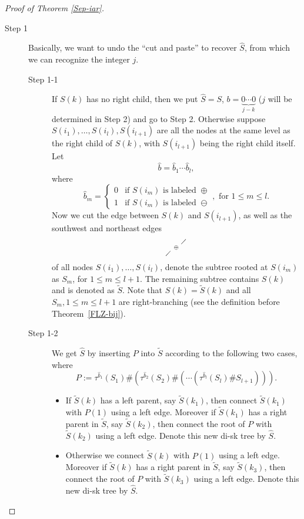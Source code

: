 \documentclass[11pt,reqno]{amsart}
\numberwithin{equation}{section}
\theoremstyle{plain}
\theoremstyle{definition}
\begin{document}
\begin{proof}[Proof of Theorem \ref{Sep-iar}]
\begin{description}
	\item[Step 1] Basically, we want to undo the ``cut and paste'' to recover $\hat{S}$, from which we can recognize the integer $j$. 
    \begin{description}
    	\item[Step 1-1] If $S(k)$ has no right child, then we put $\hat{S}=S$, $b=\underbrace{0\cdots 0}_{j-k}$ ($j$ will be determined in Step 2) and go to Step 2. Otherwise suppose $S(i_1),\ldots,S(i_l),S(i_{l+1})$ are all the nodes at the same level as the right child of $S(k)$, with $S(i_{l+1})$ being the right child itself. Let $$\hat{b}=\hat{b}_1\cdots\hat{b}_l,$$ where $$\hat{b}_m=\begin{cases}0 & \text{if $S(i_{m})$ is labeled $\oplus$}\\ 1 & \text{if $S(i_{m})$ is labeled $\ominus$}\end{cases}, \text{ for $1\le m\le l$}.$$ Now we cut the edge between $S(k)$ and $S(i_{l+1})$, as well as the southwest and northeast edges $$
    \begin{smallmatrix}
    & & \diagup \\
	& \oplus & \\
	\diagup & & \\
	\end{smallmatrix}$$ of all nodes $S(i_1),\ldots,S(i_{l})$, denote the subtree rooted at $S(i_m)$ as $S_m$, for $1\le m\le l+1$. The remaining subtree contains $S(k)$ and is denoted as $\tilde{S}$. Note that $S(k)=\tilde{S}(k)$ and all $S_m, 1\le m\le l+1$ are right-branching (see the definition before Theorem~\ref{FLZ-bij}). 
    	\item[Step 1-2] We get $\hat{S}$ by inserting $P$ into $\tilde{S}$ according to the following two cases, where
        $$P:=\tau^{\hat{b}_1}(S_1)\#(\tau^{\hat{b}_2}(S_2)\#(\cdots(\tau^{\hat{b}_l}(S_l)\#S_{l+1}))).$$
        \begin{itemize}
        	\item If $\tilde{S}(k)$ has a left parent, say $\tilde{S}(k_1)$, then connect $\tilde{S}(k_1)$ with $P(1)$ using a left edge. Moreover if $\tilde{S}(k_1)$ has a right parent in $\tilde{S}$, say $\tilde{S}(k_2)$, then connect the root of $P$ with $\tilde{S}(k_2)$ using a left edge. Denote this new di-sk tree by $\hat{S}$.
        	\item Otherwise we connect $\tilde{S}(k)$ with $P(1)$ using a left edge. Moreover if $\tilde{S}(k)$ has a right parent in $\tilde{S}$, say $\tilde{S}(k_3)$, then connect the root of $P$ with $\tilde{S}(k_3)$ using a left edge. Denote this new di-sk tree by $\hat{S}$.

\end{itemize}
\end{description}
\end{description}
\end{proof}
\end{document}
